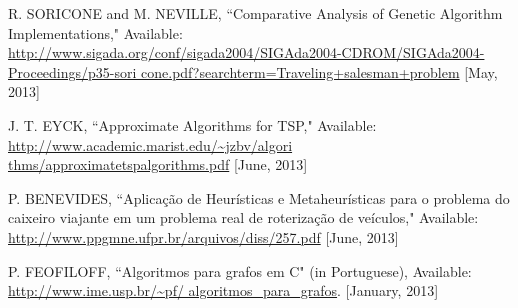 \documentclass[journal]{IEEEtran}
\begin{document}
\begin{thebibliography}{1}
	
R. SORICONE and M. NEVILLE, ``Comparative Analysis of Genetic Algorithm Implementations," Available: \url{http://www.sigada.org/conf/sigada2004/SIGAda2004-CDROM/SIGAda2004-Proceedings/p35-sori cone.pdf?searchterm=Traveling+salesman+problem} [May, 2013]

J. T. EYCK, ``Approximate Algorithms for TSP,"
Available: \url{http://www.academic.marist.edu/~jzbv/algori thms/approximatetspalgorithms.pdf}
[June, 2013]

P. BENEVIDES, ``Aplicação de Heurísticas e Metaheurísticas para o problema do caixeiro viajante em um problema real de roterização de veículos," Available: \url{http://www.ppgmne.ufpr.br/arquivos/diss/257.pdf} [June, 2013]

P. FEOFILOFF, ``Algoritmos para grafos em C" (in Portuguese), Available: \url{http://www.ime.usp.br/~pf/ algoritmos_para_grafos}. [January, 2013]

\end{thebibliography}
\end{document}
